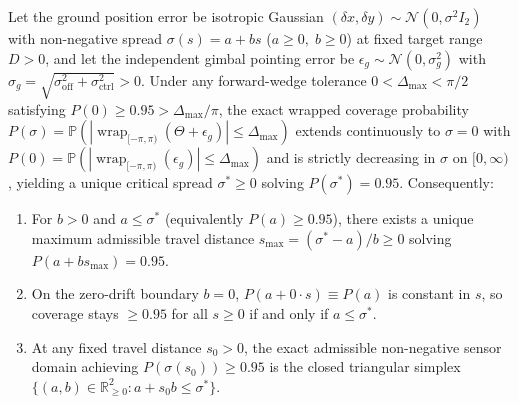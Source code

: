 \begin{keybox}
\begin{theorem}
\label{thm:p3-monotone}
Let the ground position error be isotropic Gaussian $(\delta x, \delta y) \sim \mathcal{N}(0, \sigma^2 I_2)$ with non-negative spread $\sigma(s) = a + bs$ ($a \ge 0,\; b \ge 0$) at fixed target range $D > 0$, and let the independent gimbal pointing error be $\epsilon_g \sim \mathcal{N}(0, \sigma_g^2)$ with $\sigma_g = \sqrt{\sigma_{\mathrm{off}}^2 + \sigma_{\mathrm{ctrl}}^2} > 0$. Under any forward-wedge tolerance $0 < \Delta_{\max} < \pi/2$ satisfying $P(0) \ge 0.95 > \Delta_{\max}/\pi$, the exact wrapped coverage probability $P(\sigma) = \mathbb{P}\!\left(|\operatorname{wrap}_{[-\pi,\pi)}(\Theta+\epsilon_g)| \le \Delta_{\max}\right)$ extends continuously to $\sigma=0$ with $P(0) = \mathbb{P}(|\operatorname{wrap}_{[-\pi,\pi)}(\epsilon_g)| \le \Delta_{\max})$ and is strictly decreasing in $\sigma$ on $[0, \infty)$, yielding a unique critical spread $\sigma^* \ge 0$ solving $P(\sigma^*) = 0.95$. Consequently:
\begin{enumerate}[leftmargin=1.5em,itemsep=1pt,topsep=2pt,parsep=0pt]
  \item For $b > 0$ and $a \le \sigma^*$ (equivalently $P(a) \ge 0.95$), there exists a unique maximum admissible travel distance $s_{\max} = (\sigma^* - a)/b \ge 0$ solving $P(a + b s_{\max}) = 0.95$.
  \item On the zero-drift boundary $b = 0$, $P(a + 0\cdot s) \equiv P(a)$ is constant in $s$, so coverage stays $\ge 0.95$ for all $s \ge 0$ if and only if $a \le \sigma^*$.
  \item At any fixed travel distance $s_0 > 0$, the exact admissible non-negative sensor domain achieving $P(\sigma(s_0)) \ge 0.95$ is the closed triangular simplex $\{(a,b) \in \mathbb{R}_{\ge 0}^2 : a + s_0 b \le \sigma^*\}$.
\end{enumerate}
\end{theorem}
\end{keybox}

